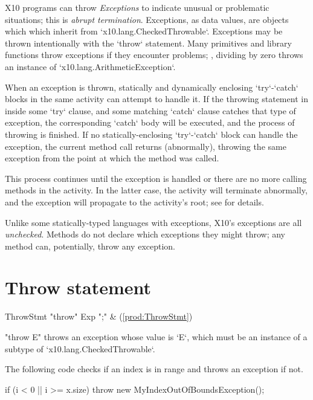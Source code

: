 X10 programs can throw {\em Exceptions} to indicate unusual or problematic
situations; this is {\em abrupt termination}.  Exceptions, as data values, are
objects which which inherit from 
\xcd`x10.lang.CheckedThrowable`.    Exceptions may be thrown intentionally with the
\xcd`throw` statement. Many primitives and library functions throw exceptions
if they encounter problems; \eg, dividing by zero throws an instance of
\xcd`x10.lang.ArithmeticException`. 

When an exception is thrown, statically and dynamically enclosing
\xcd`try`-\xcd`catch` blocks in the same activity can attempt to handle it.   If the throwing
statement in inside some \xcd`try` clause, and some matching \xcd`catch`
clause catches that type of exception, the corresponding \xcd`catch` body will
be executed, and the process of throwing is finished.  
If no statically-enclosing \xcd`try`-\xcd`catch` block can handle the
exception, the current method call returns (abnormally), throwing the same
exception from the point at which the method was called.  

This process continues until the exception is handled or there are no more
calling methods in the activity. In the latter case, the activity will
terminate abnormally, and the exception will propagate to the activity's root;
see  for details.

Unlike some statically-typed languages with exceptions, X10's exceptions are
all {\em unchecked}. Methods do not declare which exceptions they might throw;
any method can, potentially, throw any exception.


\section{Throw statement}

\begin{bbgrammar}
           ThrowStmt \: \xcd"throw" Exp \xcd";" & (\ref{prod:ThrowStmt}) \\
\end{bbgrammar}

\xcd"throw E" throws an exception whose value is \xcd`E`, which must be an
instance of a subtype of \xcd`x10.lang.CheckedThrowable`. 

\begin{ex}
The following code checks if an index is in range and
throws an exception if not.

\begin{xten}
if (i < 0 || i >= x.size)
    throw new MyIndexOutOfBoundsException();
\end{xten}
\end{ex}

